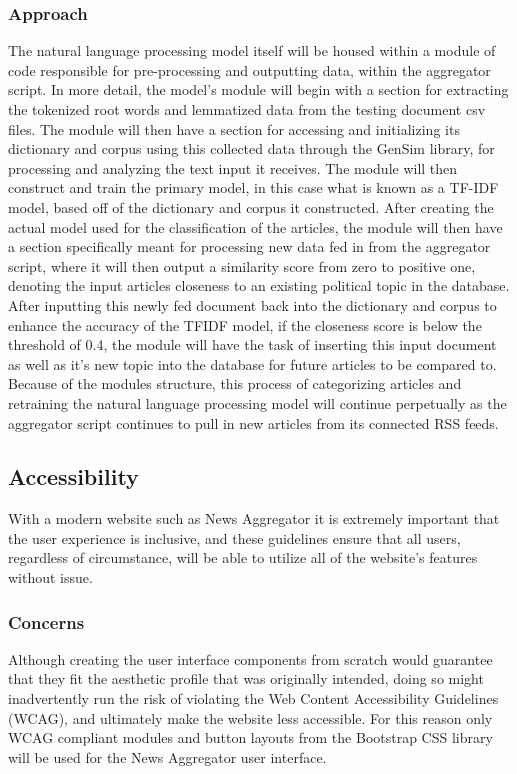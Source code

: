 \documentclass[onecolumn, draftclsnofoot,10pt, compsoc]{IEEEtran}
\begin{document}
\subsubsection{Approach}
 The natural language processing model itself will be housed within a module of code responsible for pre-processing and outputting data, within the aggregator script. In more detail, the model’s module will begin with a section for extracting the tokenized root words and lemmatized data from the testing document csv files. The module will then have a section for accessing and initializing its dictionary and corpus using this collected data through the GenSim library, for processing and analyzing the text input it receives. The module will then construct and train the primary model, in this case what is known as a TF-IDF model, based off of the dictionary and corpus it constructed. After creating the actual model used for the classification of the articles, the module will then have a section specifically meant for processing new data fed in from the aggregator script, where it will then output a similarity score from zero to positive one, denoting the input articles closeness to an existing political topic in the database. After inputting this newly fed document back into the dictionary and corpus to enhance the accuracy of the TFIDF model, if the closeness score is below the threshold of 0.4, the module will have the task of inserting this input document as well as it’s new topic into the database for future articles to be compared to. Because of the modules structure, this process of categorizing articles and retraining the natural language processing model will continue perpetually as the aggregator script continues to pull in new articles from its connected RSS feeds.
\subsection{Accessibility}
With a modern website such as News Aggregator it is extremely important that the user experience is inclusive, and these guidelines ensure that all users, regardless of circumstance, will be able to utilize all of the website’s features without issue.
\subsubsection{Concerns}
Although creating the user interface components from scratch would guarantee that they fit the aesthetic profile that was originally intended, doing so might inadvertently run the risk of violating the Web Content Accessibility Guidelines (WCAG), and ultimately make the website less accessible. For this reason only WCAG compliant modules and button layouts from the Bootstrap CSS library will be used for the News Aggregator user interface. 
\end{document}
